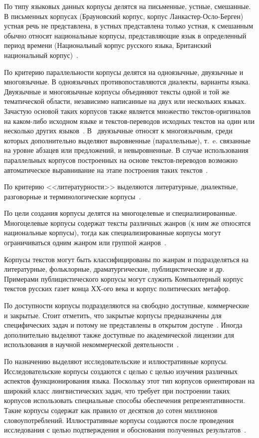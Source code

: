 По типу языковых данных корпусы делятся на письменные, устные, смешанные. В письменных корпусах (Брауновский корпус, корпус Ланкастер-Осло-Берген) устная речь не представлена, в устных представлена только устная, к смешанным обычно относят национальные корпусы, представляющие язык в определенный период времени (Национальный корпус русского языка, Британский национальный корпус)~\cite{Zaharov}.

По критерию параллельности корпусы делятся на одноязычные, двуязычные и многоязычные. В одноязычных противопоставляются диалекты, варианты языка. Двуязычные и многоязычные корпусы объединяют тексты одной и той же тематической области, независимо написанные на двух или нескольких языках. Зачастую основой таких корпусов также является множество текстов-оригиналов на каком-либо исходном языке и текстов-переводов исходных текстов на один или несколько других языков~\cite{Zaharov}. В~\cite{Kopotev} двуязычные относят к многоязычным, среди которых дополнительно выделяют выровненные (параллельные), т.~e. связанные на уровне абзацев или предложений, и невыровненные. В случае использования параллельных корпусов построенных на основе текстов-переводов возможно автоматическое выравнивание на этапе построения таких текстов~\cite{Baranov,Zubov}.

По критерию <<литературности>> выделяются литературные, диалектные, разговорные и терминологические корпусы~\cite{Zaharov}.

По цели создания корпусы делятся на многоцелевые и специализированные. Многоцелевые корпусы содержат тексты различных жанров (к ним же относятся национальные корпусы), тогда как специализированные корпусы могут ограничиваться одним жанром или группой жанров~\cite{Zaharov}.

Корпусы текстов могут быть классифицированы по жанрам и подразделяться на литературные, фольклорные, драматургические, публицистические и др. Примерами публицистического корпусы могут служить Компьютерный корпус текстов русских газет конца ХХ-ого века и корпус
политических метафор.

По доступности корпусы подразделяются на свободно доступные, коммерческие и закрытые. Стоит отметить, что закрытые корпусы предназначены для специфических задач и потому не представлены в открытом доступе~\cite{Zaharov}. Иногда дополнительно выделяют также доступные по академической лицензии для использования в научной некоммерческой деятельности~\cite{Kopotev}.

По назначению выделяют исследовательские и иллюстративные корпусы. Исследовательские корпусы создаются с целью с целью изучения различных аспектов функционирования языка. Поскольку этот тип корпусов ориентирован на широкий класс лингвистических задач, что требует при построении таких корпусов использовать специальные способы обеспечения репрезентативности. Такие корпусы содержат как правило от десятков до сотен миллионов словоупотреблений. Иллюстративные корпусы создаются после проведения исследования с целью подтверждения и обоснования полученных результатов~\cite{Zaharov}.  

